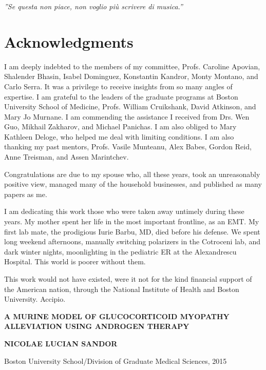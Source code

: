 \documentclass[12pt,english]{report}\usepackage[]{graphicx}\usepackage[]{color}
\begin{document}
\emph{''Se questa non piace, non voglio più scrivere di musica.''}\pagebreak{}



\section{Acknowledgments}

I am deeply indebted to the members of my committee, Profs. Caroline
Apovian, Shalender Bhasin, Isabel Dominguez, Konstantin Kandror, Monty
Montano, and Carlo Serra. It was a privilege to receive insights from
so many angles of expertise. I am grateful to the leaders of the graduate
programs at Boston University School of Medicine, Profs. William Cruikshank,
David Atkinson, and Mary Jo Murnane. I am commending the assistance
I received from Drs. Wen Guo, Mikhail Zakharov, and Michael Panichas.
I am also obliged to Mary Kathleen Deloge, who helped me deal with
limiting conditions. I am also thanking my past mentors, Profs. Vasile
Munteanu, Alex Babes, Gordon Reid, Anne Treisman, and Assen Marintchev.

Congratulations are due to my spouse who, all these years, took an
unreasonably positive view, managed many of the household businesses,
and published as many papers as me.

I am dedicating this work those who were taken away untimely during
these years. My mother spent her life in the most important frontline,
as an EMT. My first lab mate, the prodigious Iurie Barbu, MD, died
before his defense. We spent long weekend afternoons, manually switching
polarizers in the Cotroceni lab, and dark winter nights, moonlighting
in the pediatric ER at the Alexandrescu Hospital. This world is poorer
without them.

This work would not have existed, were it not for the kind financial
support of the American nation, through the National Institute of
Health and Boston University. Accipio.\pagebreak{}

\begin{center}
\textbf{A MURINE MODEL OF GLUCOCORTICOID MYOPATHY ALLEVIATION USING
ANDROGEN THERAPY}
\par\end{center}

\begin{center}
\textbf{NICOLAE LUCIAN SANDOR}
\par\end{center}

\begin{center}
Boston University School/Division of Graduate Medical Sciences, 2015
\par\end{center}
\end{document}
